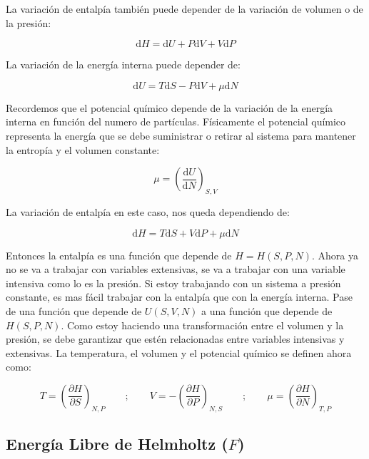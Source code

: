 \documentclass[11pt,fleqn]{book}
\begin{document}
La variación de entalpía  también puede depender de la variación de volumen o de la presión:

\begin{equation*}
   \mathrm{d}H=\mathrm{d}U+P\mathrm{d}V+V\mathrm{d}P 
\end{equation*}


La variación de la energía interna puede depender de:

\begin{equation*}
    \mathrm{d}U=T\mathrm{d}S-P\mathrm{d}V+\mu\mathrm{d}N
\end{equation*}

Recordemos que el potencial químico depende de la variación de la energía interna en función del numero de partículas. Físicamente el potencial químico representa la energía que se debe suministrar o retirar al sistema para mantener la entropía y el volumen constante:

\begin{equation}
    \mu= \left(\frac{\mathrm{d}U}{\mathrm{d}N}\right)_{S,V}
    \label{Eq. 4.54}
\end{equation}

La variación de entalpía en este caso, nos queda dependiendo de:

\begin{equation}
\mathrm{d}H=T\mathrm{d}S+V\mathrm{d}P+\mu\mathrm{d}N
    \label{Eq. 4.55}
\end{equation}

Entonces la entalpía es una función que depende de $H=H(S, P, N)$. Ahora  ya no se va a trabajar con variables extensivas, se va a trabajar con una variable intensiva como lo es la presión. Si estoy trabajando con un sistema a presión constante, es mas fácil trabajar con la entalpía que con la energía interna. Pase de una función que depende de $U(S, V, N)$ a una función que depende de $H(S, P, N)$. Como estoy haciendo una transformación entre el volumen y la presión, se debe garantizar que estén relacionadas entre variables intensivas y extensivas. La temperatura, el volumen y el potencial químico se definen ahora como:

\begin{equation}
        T=\left(\frac{\partial H}{\partial S}\right)_{N,P}\qquad;\qquad V=-\left(\frac{\partial H}{\partial P}\right)_{N,S}\qquad;\qquad \mu=\left(\frac{\partial H}{\partial N}\right)_{T,P}
    \label{Eq. 4.55a}
\end{equation}

\subsection{Energía Libre de Helmholtz ($F$)}
\end{document}
